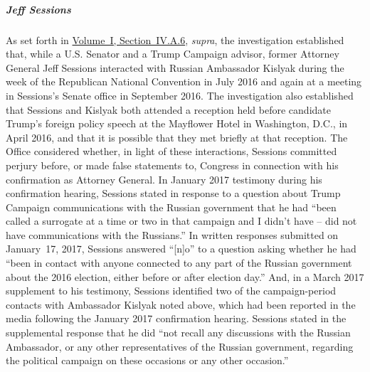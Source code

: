 

\subparagraph{Jeff Sessions}
As set forth in \hyperlink{subsubsection.1.4.1.6}{Volume~I, Section~IV.A.6}, \textit{supra}, the investigation established that, while a U.S. Senator and a Trump Campaign advisor, former Attorney General Jeff Sessions interacted with Russian Ambassador Kislyak during the week of the Republican National Convention in July 2016 and again at a meeting in Sessions's Senate office in September 2016.
The investigation also established that Sessions and Kislyak both attended a reception held before candidate Trump's foreign policy speech at the Mayflower Hotel in Washington, D.C., in April 2016, and that it is possible that they met briefly at that reception.
The Office considered whether, in light of these interactions, Sessions committed perjury before, or made false statements to, Congress in connection with his confirmation as Attorney General.
In January 2017 testimony during his confirmation hearing, Sessions stated in response to a question about Trump Campaign communications with the Russian government that he had ``been called a surrogate at a time or two in that campaign and I didn't have -- did not have communications with the Russians.''
In written responses submitted on January~17, 2017, Sessions answered ``[n]o'' to a question asking whether he had ``been in contact with anyone connected to any part of the Russian government about the 2016 election, either before or after election day.''
And, in a March 2017 supplement to his testimony, Sessions identified two of the campaign-period contacts with Ambassador Kislyak noted above, which had been reported in the media following the January 2017 confirmation hearing.
Sessions stated in the supplemental response that he did ``not recall any discussions with the Russian Ambassador, or any other representatives of the Russian government, regarding the political campaign on these occasions or any other occasion.''

